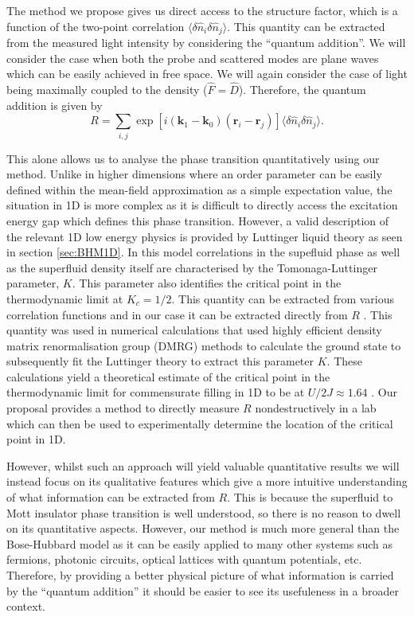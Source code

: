 The method we propose gives us direct access to the structure factor,
which is a function of the two-point correlation $\langle \delta
\hat{n}_i \delta \hat{n}_j \rangle$. This quantity can be extracted
from the measured light intensity by considering the ``quantum
addition''. We will consider the case when both the probe and
scattered modes are plane waves which can be easily achieved in free
space. We will again consider the case of light being maximally
coupled to the density ($\hat{F} = \hat{D}$). Therefore, the quantum
addition is given by
\begin{equation} 
  R =\sum_{i, j} \exp[i (\mathbf{k}_1 - \mathbf{k}_0)
  (\mathbf{r}_i - \mathbf{r}_j)] \langle \delta \hat{n}_i \delta
  \hat{n}_j \rangle.
\end{equation}

This alone allows us to analyse the phase transition quantitatively
using our method. Unlike in higher dimensions where an order parameter
can be easily defined within the mean-field approximation as a simple
expectation value, the situation in 1D is more complex as it is
difficult to directly access the excitation energy gap which defines
this phase transition. However, a valid description of the relevant 1D
low energy physics is provided by Luttinger liquid theory
\cite{giamarchi} as seen in section \ref{sec:BHM1D}. In this model
correlations in the supefluid phase as well as the superfluid density
itself are characterised by the Tomonaga-Luttinger parameter,
$K$. This parameter also identifies the critical point in the
thermodynamic limit at $K_c = 1/2$. This quantity can be extracted
from various correlation functions and in our case it can be extracted
directly from $R$ \cite{ejima2011}. This quantity was used in
numerical calculations that used highly efficient density matrix
renormalisation group (DMRG) methods to calculate the ground state to
subsequently fit the Luttinger theory to extract this parameter
$K$. These calculations yield a theoretical estimate of the critical
point in the thermodynamic limit for commensurate filling in 1D to be
at $U/2J \approx 1.64$ \cite{ejima2011}. Our proposal provides a
method to directly measure $R$ nondestructively in a lab which can
then be used to experimentally determine the location of the critical
point in 1D.

However, whilst such an approach will yield valuable quantitative
results we will instead focus on its qualitative features which give a
more intuitive understanding of what information can be extracted from
$R$. This is because the superfluid to Mott insulator phase transition
is well understood, so there is no reason to dwell on its quantitative
aspects. However, our method is much more general than the
Bose-Hubbard model as it can be easily applied to many other systems
such as fermions, photonic circuits, optical lattices with quantum
potentials, etc. Therefore, by providing a better physical picture of
what information is carried by the ``quantum addition'' it should be
easier to see its usefuleness in a broader context.


